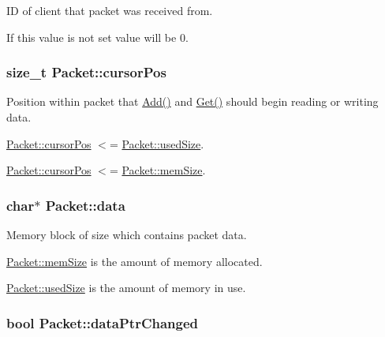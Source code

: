 ID of client that packet was received from. 

If this value is not set value will be 0. \hypertarget{class_packet_acce561b50a43897e8fd0c03222b617bd}{
\subsubsection[{cursorPos}]{\setlength{\rightskip}{0pt plus 5cm}size\_\-t {\bf Packet::cursorPos}}}
\label{class_packet_acce561b50a43897e8fd0c03222b617bd}


Position within packet that \hyperlink{class_packet_ae9adff3647758cc7f8eb4c7d132e7ba4}{Add()} and \hyperlink{class_packet_a80e211740ec18468ac623e2a333234e0}{Get()} should begin reading or writing data. 

\hyperlink{class_packet_acce561b50a43897e8fd0c03222b617bd}{Packet::cursorPos} $<$= \hyperlink{class_packet_a1da1eb4f461522942bada139f0d94acd}{Packet::usedSize}.\par
 \hyperlink{class_packet_acce561b50a43897e8fd0c03222b617bd}{Packet::cursorPos} $<$= \hyperlink{class_packet_a1c2e5054d27221467e8db5dc9e71c04a}{Packet::memSize}. \hypertarget{class_packet_a6ce50b69127890b9012cb91f287f137f}{
\subsubsection[{data}]{\setlength{\rightskip}{0pt plus 5cm}char$\ast$ {\bf Packet::data}}}
\label{class_packet_a6ce50b69127890b9012cb91f287f137f}


Memory block of size which contains packet data. 

\hyperlink{class_packet_a1c2e5054d27221467e8db5dc9e71c04a}{Packet::memSize} is the amount of memory allocated.\par
 \hyperlink{class_packet_a1da1eb4f461522942bada139f0d94acd}{Packet::usedSize} is the amount of memory in use. \hypertarget{class_packet_ab790106eb4fd31c750c3e39ee46c07c8}{
\subsubsection[{dataPtrChanged}]{\setlength{\rightskip}{0pt plus 5cm}bool {\bf Packet::dataPtrChanged}}}
\label{class_packet_ab790106eb4fd31c750c3e39ee46c07c8}


